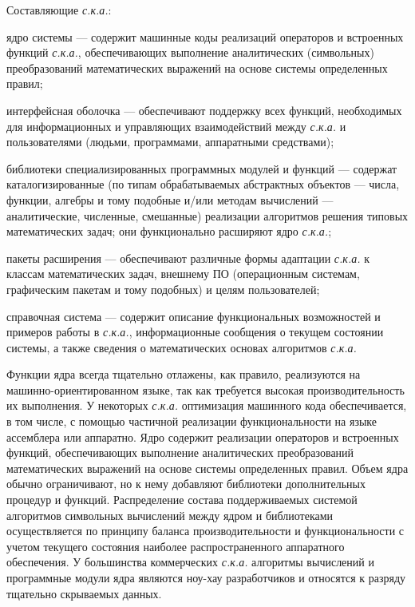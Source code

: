 Составляющие \textit{с.к.а.}:
\begin{textitemize}
	\item ядро системы --- содержит машинные коды реализаций операторов и встроенных функций \textit{с.к.а.}, обеспечивающих выполнение аналитических (символьных) преобразований математических выражений на основе системы определенных правил;
	\item интерфейсная оболочка --- обеспечивают поддержку всех функций, 
	необходимых для информационных и управляющих взаимодействий между 
	\textit{с.к.а.} и пользователями (людьми, программами, аппаратными средствами);
	\item библиотеки специализированных программных модулей и функций --- содержат каталогизированные (по типам 
	обрабатываемых абстрактных объектов --- числа, функции, алгебры и тому подобные и/или методам вычислений --- аналитические, численные, смешанные) реализации алгоритмов решения типовых математических задач; они функционально расширяют ядро \textit{с.к.а.};
	\item пакеты расширения --- обеспечивают различные формы адаптации \textit{с.к.а.} к классам математических задач, внешнему ПО (операционным системам, графическим пакетам и тому подобных) и целям пользователей;
	\item справочная система --- содержит описание функциональных возможностей и примеров работы в \textit{с.к.а.}, информационные сообщения о текущем состоянии системы, а также сведения о математических основах алгоритмов \textit{с.к.а.}
\end{textitemize}
Функции ядра всегда тщательно отлажены, как правило, реализуются на машинно-ориентированном языке, так как требуется высокая производительность их выполнения. У некоторых \textit{с.к.а.} оптимизация машинного кода обеспечивается, в том числе, с помощью частичной реализации функциональности на языке ассемблера или аппаратно. Ядро содержит реализации операторов и встроенных функций, обеспечивающих выполнение аналитических преобразований математических выражений на основе системы определенных правил. Объем ядра обычно ограничивают, но к нему добавляют библиотеки дополнительных процедур и функций. Распределение состава поддерживаемых системой алгоритмов символьных вычислений между ядром и библиотеками осуществляется по принципу баланса производительности и функциональности с учетом текущего состояния наиболее распространенного аппаратного обеспечения. У большинства коммерческих \textit{с.к.а.} алгоритмы вычислений и программные модули ядра являются ноу-хау разработчиков и относятся к разряду тщательно скрываемых данных.

